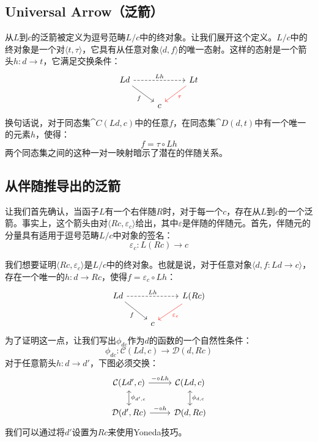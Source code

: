 \documentclass[DaoFP]{subfiles}
\begin{document}
    \subsection{Universal Arrow（泛箭）}

    从$L$到$c$的泛箭被定义为逗号范畴$L/c$中的终对象。让我们展开这个定义。$L/c$中的终对象是一个对$\langle t, \tau \rangle$，它具有从任意对象$\langle d, f \rangle$的唯一态射。这样的态射是一个箭头$h \colon d \to t$，它满足交换条件：
    \[
        \begin{tikzcd}
            L d
            \arrow[rd, "f"']
            \arrow[rr, dashed, "L h"]
            && L t
            \arrow[ld, red, "\tau"]
            \\
            &c
        \end{tikzcd}
    \]
    换句话说，对于同态集$\cat C (L d, c)$中的任意$f$，在同态集$\cat D (d, t)$中有一个唯一的元素$h$，使得：
    \[ f = \tau \circ L h \]
    两个同态集之间的这种一对一映射暗示了潜在的伴随关系。

    \subsection{从伴随推导出的泛箭}

    让我们首先确认，当函子$L$有一个右伴随$R$时，对于每一个$c$，存在从$L$到$c$的一个泛箭。事实上，这个箭头由对$\langle R c, \varepsilon_c \rangle$给出，其中$\varepsilon$是伴随的伴随元。首先，伴随元的分量具有适用于逗号范畴$L/c$中对象的签名：
    \[ \varepsilon_c \colon L (R c) \to c \]

    我们想要证明$\langle R c, \varepsilon_c \rangle$是$L/c$中的终对象。也就是说，对于任意对象$\langle d, f \colon L d \to c \rangle$，存在一个唯一的$h \colon d \to R c$，使得$f = \varepsilon_c \circ L h$：
    \[
        \begin{tikzcd}
            L d
            \arrow[rd, "f"']
            \arrow[rr, dashed, "L h"]
            && L (R c)
            \arrow[ld, red, "\varepsilon_c"]
            \\
            &c
        \end{tikzcd}
    \]
    为了证明这一点，让我们写出$\phi_{d c}$作为$d$的函数的一个自然性条件：
    \[  \phi_{d c} \colon \mathcal{C} (L d, c) \to \mathcal{D}( d , R c)\]
    对于任意箭头$h \colon d \to d'$，下图必须交换：
    \[
        \begin{tikzcd}
            \mathcal{C}(L d', c)
            \arrow[d, leftrightarrow, "\phi_{d', c}"]
            \arrow[r, "- \circ L h"]
            &
            \mathcal{C}(L d, c)
            \arrow[d, leftrightarrow, "\phi_{d, c}"]
            \\
            \mathcal{D}(d', R c)
            \arrow[r, "- \circ h"]
            & \mathcal{D}(d, R c)
        \end{tikzcd}
    \]
    我们可以通过将$d'$设置为$R c$来使用Yoneda技巧。
\end{document}
